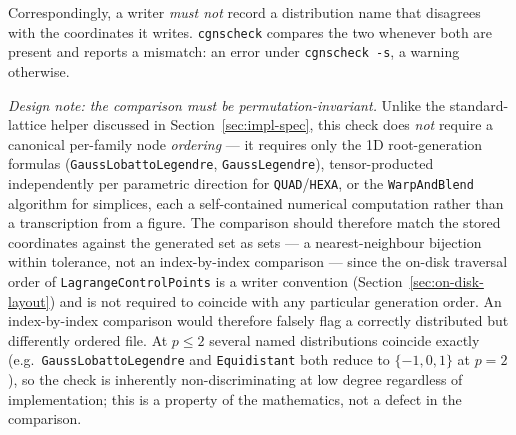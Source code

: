 \documentclass[11pt,letterpaper]{article}
\begin{document}
Correspondingly, a writer \emph{must not} record a distribution name that disagrees with the
coordinates it writes.  \texttt{cgnscheck} compares the two whenever both are present and
reports a mismatch: an error under \texttt{cgnscheck -s}, a warning otherwise.

\emph{Design note: the comparison must be permutation-invariant.}  Unlike the standard-lattice
helper discussed in Section~\ref{sec:impl-spec}, this check does \emph{not} require a canonical
per-family node \emph{ordering} --- it requires only the 1D root-generation formulas
(\texttt{GaussLobattoLegendre}, \texttt{GaussLegendre}), tensor-producted independently per
parametric direction for \texttt{QUAD}/\texttt{HEXA}, or the \texttt{WarpAndBlend} algorithm for
simplices, each a self-contained numerical computation rather than a transcription from a
figure.  The comparison should therefore match the stored coordinates against the generated set
as sets --- a nearest-neighbour bijection within tolerance, not an index-by-index
comparison --- since the on-disk traversal order of \texttt{LagrangeControlPoints} is a writer
convention (Section~\ref{sec:on-disk-layout}) and is not required to coincide with any particular
generation order.  An index-by-index comparison would therefore falsely flag a correctly
distributed but differently ordered file.  At $p \le 2$ several named distributions coincide
exactly (e.g.\ \texttt{GaussLobattoLegendre} and \texttt{Equidistant} both reduce to
$\{-1,0,1\}$ at $p=2$), so the check is inherently non-discriminating at low degree regardless of
implementation; this is a property of the mathematics, not a defect in the comparison.
\end{document}
